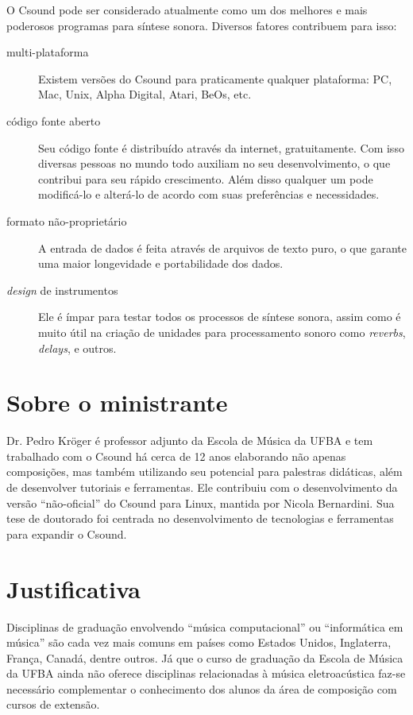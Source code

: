 \documentclass[12pt,brazil]{article}
\newcommand{\eng}[1]{\textit{#1}}
\begin{document}
O Csound pode ser considerado atualmente como um dos melhores e mais
poderosos programas para síntese sonora.  Diversos fatores contribuem
para isso:
\begin{description}
\item [multi-plataforma] Existem versões do {Csound} para praticamente
  qualquer plataforma: PC, Mac, Unix, Alpha Digital, Atari, BeOs, etc.
\item [código fonte aberto] Seu código fonte é distribuído através da
  internet, gratuitamente. Com isso diversas pessoas no mundo todo
  auxiliam no seu desenvolvimento, o que contribui para seu rápido
  crescimento. Além disso qualquer um pode modificá-lo e alterá-lo de
  acordo com suas preferências e necessidades.
\item [formato não-proprietário] A entrada de dados é feita através de
  arquivos de texto puro, o que garante uma maior longevidade e
  portabilidade dos dados.
\item [\eng{design} de instrumentos] Ele é ímpar para testar todos os
  processos de síntese sonora, assim como é muito útil na criação de
  unidades para processamento sonoro como \eng{reverbs}, \eng{delays},
  e outros.
\end{description}


\section{Sobre o ministrante} 

Dr. Pedro Kröger é professor adjunto da Escola de Música da UFBA e tem
trabalhado com o Csound há cerca de 12 anos elaborando não apenas
composições, mas também utilizando seu potencial para palestras
didáticas, além de desenvolver tutoriais e ferramentas. Ele contribuiu
com o desenvolvimento da versão ``não-oficial'' do Csound para Linux,
mantida por Nicola Bernardini. Sua tese de doutorado foi centrada no
desenvolvimento de tecnologias e ferramentas para expandir o Csound.

\section{Justificativa}

Disciplinas de graduação envolvendo ``música computacional'' ou
``informática em música'' são cada vez mais comuns em países como
Estados Unidos, Inglaterra, França, Canadá, dentre outros. Já que o
curso de graduação da Escola de Música da UFBA ainda não oferece
disciplinas relacionadas à música eletroacústica faz-se necessário
complementar o conhecimento dos alunos da área de composição com
cursos de extensão.
\end{document}

